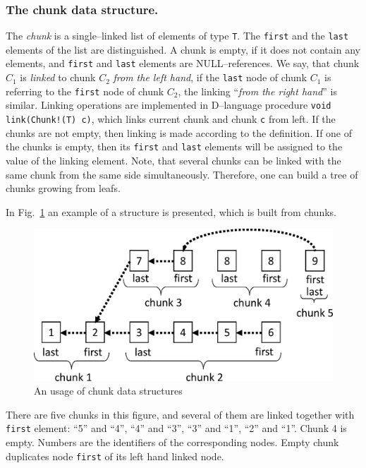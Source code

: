 \documentclass[runningheads,a4paper]{llncs}
\begin{document}
\subsubsection{The chunk data structure.}
The \emph{chunk} is a single--linked list of elements of type {\tt T}. The \texttt{first} and the \texttt{last} elements of the list are distinguished.  A chunk is empty, if it does not contain any elements, and \texttt{first} and \texttt{last} elements are NULL--references. We say, that chunk $C_1$ is \emph{linked} to chunk $C_2$ \emph {from the left hand}, if the \texttt{last} node of chunk $C_1$ is referring to the \texttt{first} node of chunk $C_2$, the linking ``\emph{from the right hand}'' is similar. Linking operations are implemented in D--language procedure {\tt void link(Chunk!(T) c)}, which links current chunk and chunk {\tt c} from left. If the chunks are not empty, then linking is made according to the definition. If one of the chunks is empty, then its \texttt{first} and \texttt{last} elements will be assigned to the value of the linking element. Note, that several chunks can be linked with the same chunk from the same side simultaneously. Therefore, one can build a tree of chunks growing from leafs.


In Fig.~\ref{fig:chunk1} an example of a structure is presented, which is built from chunks.
\begin{figure}[h]
  \vspace{0.5cm}
  \centering
  \includegraphics[width=0.6\linewidth]{img/ChunkFullp1.eps}
  \caption{An usage of chunk data structures}
  \label{fig:chunk1}
\end{figure}
There are five chunks in this figure, and several of them are linked together with \texttt{first} element: ``5'' and ``4'', ``4'' and ``3'', ``3'' and ``1'', ``2'' and ``1''. Chunk 4 is empty. Numbers are the identifiers of the corresponding nodes. Empty chunk duplicates node \texttt{first} of its left hand linked node.
\end{document}
